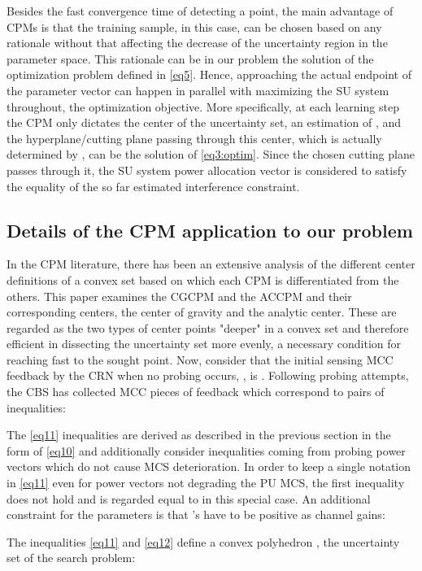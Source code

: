 \documentclass[journal]{IEEEtran}
\begin{document}
Besides the fast convergence time of detecting a point, the main advantage of CPMs is that the training sample,  in this case, can be chosen based on any rationale without that affecting the decrease of the uncertainty region in the parameter  space. This rationale can be in our problem the solution of the optimization problem defined in \eqref{eq5}. Hence, approaching the actual endpoint of the parameter vector  can happen in parallel with maximizing the SU system throughout, the optimization objective. More specifically, at each learning step the CPM only dictates the center of the uncertainty set, an estimation of , and the hyperplane/cutting plane passing through this center, which is actually determined by , can be the solution of \eqref{eq3:optim}. Since the chosen cutting plane passes through it, the SU system power allocation vector is considered to satisfy the equality of the so far estimated interference constraint.

\subsection{Details of the CPM application to our problem}

In the CPM literature, there has been an extensive analysis of the different center definitions of a convex set based on which each CPM is differentiated from the others. This paper examines the CGCPM and the ACCPM and their corresponding centers, the center of gravity and the analytic center. These are regarded as the two types of center points "deeper" in a convex set and therefore efficient in dissecting the uncertainty set more evenly, a necessary condition for reaching fast to the sought point. Now, consider that the initial sensing MCC feedback by the CRN when no probing occurs, , is . Following  probing attempts, the CBS has collected  MCC pieces of feedback which correspond to  pairs of inequalities:


The \eqref{eq11} inequalities are derived as described in the previous section in the form of \eqref{eq10} and additionally consider inequalities coming from probing power vectors which do not cause MCS deterioration. In order to keep a single notation in \eqref{eq11} even for power vectors not degrading the PU MCS, the first inequality does not hold and  is regarded equal to  in this special case. An additional constraint for the  parameters is that 's have to be positive as channel gains:


The inequalities \eqref{eq11} and \eqref{eq12} define a convex polyhedron , the uncertainty set of the search problem:
\end{document}

